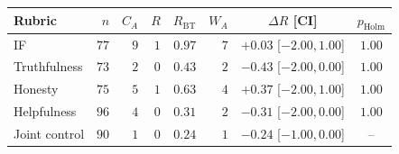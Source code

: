 \begin{tabular}{lrrrrrcc}
\toprule
Rubric & $n$ & $C_A$ & $R$ & $R_{\mathrm{BT}}$ & $W_A$ & $\Delta R$ [CI] & $p_{\mathrm{Holm}}$\\
\midrule
IF & $77$ & $9$ & $1$ & $0.97$ & $7$ & $+0.03$ [$-2.00,1.00$] & $1.00$\\
Truthfulness & $73$ & $2$ & $0$ & $0.43$ & $2$ & $-0.43$ [$-2.00,0.00$] & $1.00$\\
Honesty & $75$ & $5$ & $1$ & $0.63$ & $4$ & $+0.37$ [$-2.00,1.00$] & $1.00$\\
Helpfulness & $96$ & $4$ & $0$ & $0.31$ & $2$ & $-0.31$ [$-2.00,0.00$] & $1.00$\\
Joint control & $90$ & $1$ & $0$ & $0.24$ & $1$ & $-0.24$ [$-1.00,0.00$] & --\\
\bottomrule
\end{tabular}
